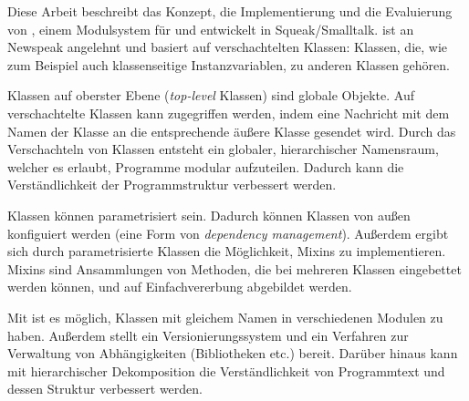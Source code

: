 \begin{zusammenfassung}
Diese Arbeit beschreibt das Konzept, die Implementierung und die Evaluierung von \msname, einem Modulsystem für und entwickelt in Squeak/Smalltalk. \msname ist an Newspeak angelehnt und basiert auf verschachtelten Klassen: Klassen, die, wie zum Beispiel auch klassenseitige Instanzvariablen, zu anderen Klassen gehören.

Klassen auf oberster Ebene (\emph{top-level} Klassen) sind globale Objekte. Auf verschachtelte Klassen kann zugegriffen werden, indem eine Nachricht mit dem Namen der Klasse an die entsprechende äußere Klasse gesendet wird. Durch das Verschachteln von Klassen entsteht ein globaler, hierarchischer Namensraum, welcher es erlaubt, Programme modular aufzuteilen. Dadurch kann die Verständlichkeit der Programmstruktur verbessert werden.

Klassen können parametrisiert sein. Dadurch können Klassen von außen konfiguiert werden (eine Form von \emph{dependency management}). Außerdem ergibt sich durch parametrisierte Klassen die Möglichkeit, Mixins zu implementieren. Mixins sind Ansammlungen von Methoden, die bei mehreren Klassen eingebettet werden können, und auf Einfachvererbung abgebildet werden. 

Mit \msname ist es möglich, Klassen mit gleichem Namen in verschiedenen Modulen zu haben. Außerdem stellt \msname ein Versionierungssystem und ein Verfahren zur Verwaltung  von Abhängigkeiten (Bibliotheken etc.) bereit. Darüber hinaus kann mit hierarchischer Dekomposition die Verständlichkeit von Programmtext und dessen Struktur verbessert werden.
\end{zusammenfassung}

